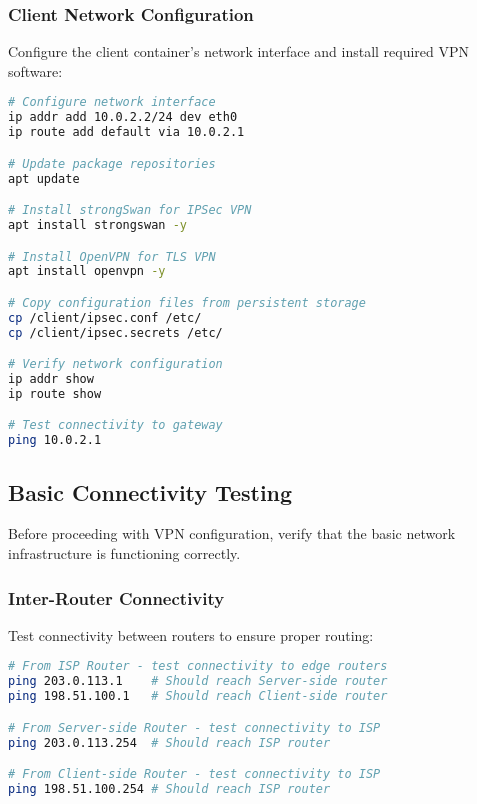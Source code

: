 \subsubsection{Client Network Configuration}

Configure the client container's network interface and install required VPN software:

\begin{lstlisting}[language=bash]
# Configure network interface
ip addr add 10.0.2.2/24 dev eth0
ip route add default via 10.0.2.1

# Update package repositories
apt update

# Install strongSwan for IPSec VPN
apt install strongswan -y

# Install OpenVPN for TLS VPN  
apt install openvpn -y

# Copy configuration files from persistent storage
cp /client/ipsec.conf /etc/
cp /client/ipsec.secrets /etc/

# Verify network configuration
ip addr show
ip route show

# Test connectivity to gateway
ping 10.0.2.1
\end{lstlisting}

\subsection{Basic Connectivity Testing}

Before proceeding with VPN configuration, verify that the basic network infrastructure is functioning correctly.

\subsubsection{Inter-Router Connectivity}

Test connectivity between routers to ensure proper routing:

\begin{lstlisting}[language=bash]
# From ISP Router - test connectivity to edge routers
ping 203.0.113.1    # Should reach Server-side router
ping 198.51.100.1   # Should reach Client-side router

# From Server-side Router - test connectivity to ISP
ping 203.0.113.254  # Should reach ISP router

# From Client-side Router - test connectivity to ISP  
ping 198.51.100.254 # Should reach ISP router
\end{lstlisting}

